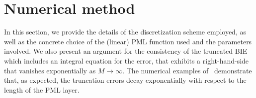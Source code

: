 \documentclass[review,hidelinks,onefignum,onetabnum]{siamart220329}
\newcommand{\pder}[2]{\frac{\partial #1}{\partial #2}}
\newcommand{\R}{\mathbb{R}}
\newcommand{\C}{\mathbb{C}}
\newcommand{\bn}{\mathbf{n}}
\newcommand{\bx}{\mathbf{x}}
\newcommand{\btau}{\boldsymbol{\tau}}
\newcommand{\by}{\mathbf{y}}
\begin{document}


\section{Numerical method}\label{sec:Nyst_meth}

In this section, we provide the details of the discretization scheme employed, as
well as the concrete choice of the (linear) PML function used and the parameters involved. %
We also present an argument for the consistency of the truncated BIE which includes an integral equation for the error, that exhibits a right-hand-side that vanishes exponentially as $M\to\infty$. The numerical examples of~ demonstrate that, as expected, the truncation errors decay exponentially with respect to the length of the PML layer.
\end{document}
